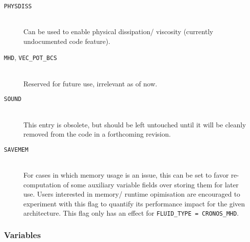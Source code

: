 \begin{description}

\item[{\tt PHYSDISS}]{\ }\\
  Can be used to enable physical dissipation/ viscosity (currently
  undocumented code feature).
  
\item[{\tt MHD}, {\tt VEC\_POT\_BCS}]{\ }\\
  Reserved for future use, irrelevant as of now.
  
\item[{\tt SOUND}]{\ }\\
  This entry is obsolete, but should be left untouched until it will
  be cleanly removed from the code in a forthcoming revision.
  

\item[{\tt SAVEMEM}]{\ }\\ For cases in which memory usage is an
  issue, this can be set to favor re-computation of some auxiliary
  variable fields over storing them for later use. Users interested
  in memory/ runtime opimisation are encouraged to experiment with
  this flag to quantify its performance impact for the given
  architecture. This flag only has an effect for
  \verb+FLUID_TYPE = CRONOS_MHD+.
  
\end{description}

\subsubsection{Variables}

